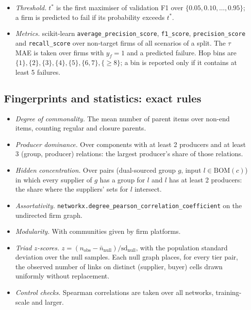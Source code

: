 \documentclass{ifacconf}
\begin{document}
\begin{itemize}
\begin{itemize}
  \item keep the state if the AUPRC strictly improves.
  \end{itemize}
  The Huber loss on severity uses $\delta=1$. The positive weight is computed once from the training labels of non-target firms.
\item \emph{Threshold.} $t^\ast$ is the first maximiser of validation F1 over $\{0.05,0.10,\dots,0.95\}$; a firm is predicted to fail if its probability exceeds $t^\ast$.
\item \emph{Metrics.} scikit-learn \texttt{average\_precision\_score}, \texttt{f1\_score}, \texttt{precision\_score} and \texttt{recall\_score} over non-target firms of all scenarios of a split. The $\tau$ MAE is taken over firms with $y_f=1$ and a predicted failure. Hop bins are $\{1\},\{2\},\{3\},\{4\},\{5\},\{6,7\},\{\ge8\}$; a bin is reported only if it contains at least 5 failures.
\end{itemize}

\subsection{Fingerprints and statistics: exact rules}
\begin{itemize}
\item \emph{Degree of commonality.} The mean number of parent items over non-end items, counting regular and closure parents.
\item \emph{Producer dominance.} Over components with at least 2 producers and at least 3 (group, producer) relations: the largest producer's share of those relations.
\item \emph{Hidden concentration.} Over pairs (dual-sourced group $g$, input $l\in\mathrm{BOM}(c)$) in which every supplier of $g$ has a group for $l$ and $l$ has at least 2 producers: the share where the suppliers' sets for $l$ intersect.
\item \emph{Assortativity.} \texttt{networkx.degree\_pearson\_correlation\_coefficient} on the undirected firm graph.
\item \emph{Modularity.} With communities given by firm platforms.
\item \emph{Triad $z$-scores.} $z=(n_{\mathrm{obs}}-\bar n_{\mathrm{null}})/\mathrm{sd}_{\mathrm{null}}$, with the population standard deviation over the null samples. Each null graph places, for every tier pair, the observed number of links on distinct (supplier, buyer) cells drawn uniformly without replacement.
\item \emph{Control checks.} Spearman correlations are taken over all networks, training-scale and larger.
\end{itemize}
\end{document}
